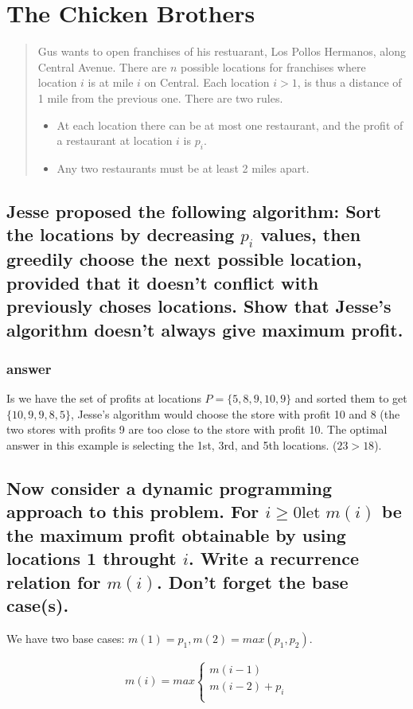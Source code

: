 \documentclass[titlepage]{article}\usepackage[]{graphicx}\usepackage[]{color}
\begin{document}
\section{The Chicken Brothers} 
\begin{quote}
Gus wants to open franchises of his restuarant, Los Pollos Hermanos,
along Central Avenue. There are $n$ possible locations for franchises where
location $i$ is at mile $i$ on Central. Each location $i>1$, is thus a distance
of 1 mile from the previous one. There are two rules.
\begin{itemize}
\item At each location there can be at most one restaurant, and the profit of a
  restaurant at location $i$ is $p_i$. 
  \item Any two restaurants must be at least 2 miles apart.
\end{itemize}
\end{quote}
\subsection{ Jesse proposed the following algorithm: Sort the locations by
  decreasing $p_i$ values, then greedily choose the next possible location,
  provided that it doesn't conflict with previously choses locations. Show that
Jesse's algorithm doesn't always give maximum profit.}

\subsubsection{answer}
Is we have the set of profits at locations $P = \{5, 8, 9, 10, 9\}$ and sorted
them to get $\{10, 9, 9, 8, 5\}$, Jesse's algorithm would choose the store with
profit 10 and 8 (the two stores with profits 9 are too close to the store with
profit 10. The optimal answer in this example is selecting the 1st, 3rd, and
5th locations. ($23 > 18$). 

\subsection{Now consider a dynamic programming approach to this problem. For
  $i\geq 0 \text{let } m(i)$ be the maximum profit obtainable by using
  locations 1 throught $i$. Write a recurrence relation for $m(i)$. Don't
forget the base case(s).}
We have two base cases:
$ m(1) = p_1 , m(2) = max(p_1, p_2)$. 

\begin{align*}
m(i) = max \begin{cases} 
		  m(i-1)  \\
		  m(i-2) + p_i\\
\end{cases}
\end{align*}
\end{document}

